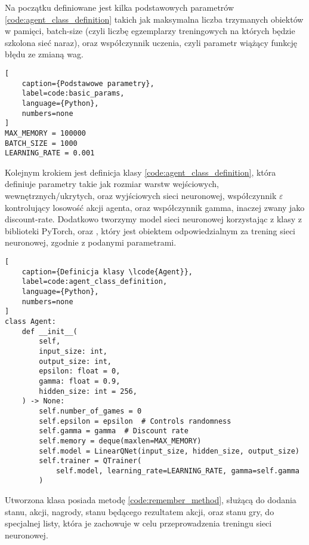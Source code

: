 Na początku definiowane jest kilka podstawowych parametrów \ref{code:agent_class_definition} takich jak maksymalna liczba trzymanych obiektów w pamięci, batch-size \cite{BatchNormalization} (czyli liczbę egzemplarzy treningowych na których będzie szkolona sieć naraz), oraz współczynnik uczenia, czyli parametr wiążący funkcję błędu ze zmianą wag.

\begin{onepage}
    \begin{lstlisting}[
    caption={Podstawowe parametry},
    label=code:basic_params,
    language={Python},
    numbers=none
]
MAX_MEMORY = 100000
BATCH_SIZE = 1000
LEARNING_RATE = 0.001
    \end{lstlisting}
\end{onepage}


Kolejnym krokiem jest definicja klasy  \ref{code:agent_class_definition}, która definiuje parametry takie jak rozmiar warstw wejściowych, wewnętrznych/ukrytych, oraz wyjściowych sieci neuronowej, współczynnik $\varepsilon$ kontrolujący losowość akcji agenta, oraz współczynnik gamma, inaczej zwany jako discount-rate. Dodatkowo tworzymy model sieci neuronowej  korzystając z klasy  z biblioteki PyTorch, oraz , który jest obiektem odpowiedzialnym za trening sieci neuronowej, zgodnie z podanymi parametrami.

\begin{onepage}
    \begin{lstlisting}[
    caption={Definicja klasy \lcode{Agent}},
    label=code:agent_class_definition,
    language={Python},
    numbers=none
]
class Agent:
    def __init__(
        self,
        input_size: int,
        output_size: int,
        epsilon: float = 0,
        gamma: float = 0.9,
        hidden_size: int = 256,
    ) -> None:
        self.number_of_games = 0
        self.epsilon = epsilon  # Controls randomness
        self.gamma = gamma  # Discount rate
        self.memory = deque(maxlen=MAX_MEMORY)
        self.model = LinearQNet(input_size, hidden_size, output_size)
        self.trainer = QTrainer(
            self.model, learning_rate=LEARNING_RATE, gamma=self.gamma
        )
    \end{lstlisting}
\end{onepage}

Utworzona klasa posiada metodę  \ref{code:remember_method}, służącą do dodania stanu, akcji, nagrody, stanu będącego rezultatem akcji, oraz stanu gry, do specjalnej listy, która je zachowuje w celu przeprowadzenia treningu sieci neuronowej.


